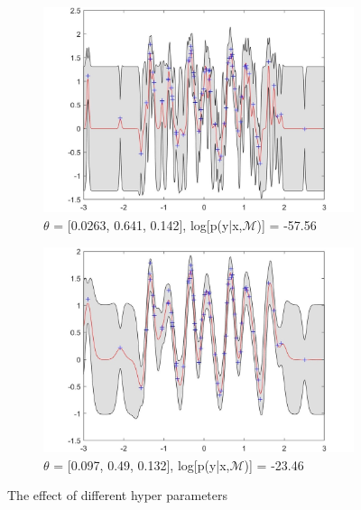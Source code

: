 \documentclass[twoside,twocolumn]{article}
\begin{document}
\begin{figure}[h]
\begin{subfigure}[t]{0.49\linewidth}
        \includegraphics[width=\textwidth]{c_1_2_4_graph}
        \caption{\textbf{$\theta$} = [0.0263, 0.641, 0.142], log[p(y|x,$\mathcal{M}$)] = -57.56} 
        \label{sub:hyp3}
    \end{subfigure}
    \begin{subfigure}[t]{0.49\linewidth}
        \centering
        \includegraphics[width=\textwidth]{c_1_2_5_graph}
        \caption{\textbf{$\theta$} = [0.097, 0.49, 0.132], log[p(y|x,$\mathcal{M}$)] = -23.46}
        \label{sub:hyp4}
    \end{subfigure}
    \caption{The effect of different hyper parameters}
    \label{fig:hyp}
\end{figure}
\end{document}
